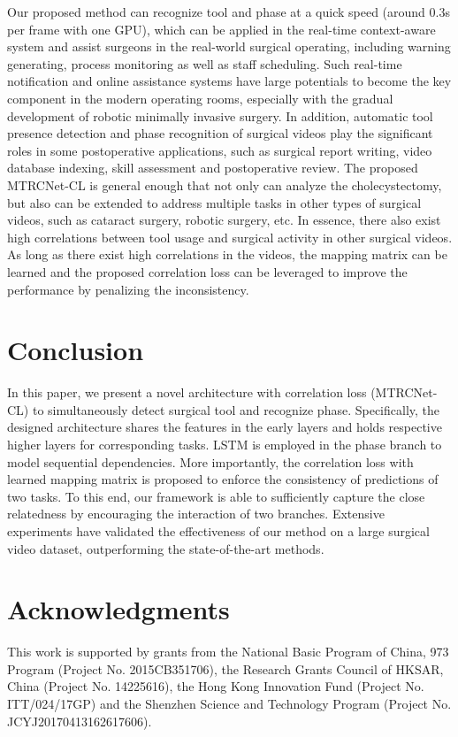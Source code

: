 \documentclass{elsarticle}
\begin{document}
Our proposed method can recognize tool and phase at a quick speed (around 0.3s per frame with one GPU),
which can be applied in the real-time context-aware system and assist surgeons in the real-world surgical operating,
including warning generating, process monitoring as well as staff scheduling.
Such real-time notification and online assistance systems have large potentials to become the key component in the modern operating rooms, especially with the gradual development of robotic minimally invasive surgery.
In addition, automatic tool presence detection and phase recognition of surgical videos play the significant roles in some postoperative applications, such as surgical report writing, video database indexing, skill assessment and postoperative review.
The proposed MTRCNet-CL is general enough that not only can analyze the cholecystectomy, but also can be extended to address multiple tasks in other types of surgical videos, such as cataract surgery, robotic surgery, etc.
In essence, there also exist high correlations between tool usage and surgical activity in other surgical videos.
As long as there exist high correlations in the videos, the mapping matrix can be learned and the proposed correlation loss can be leveraged to improve the performance by penalizing the inconsistency.





\section{Conclusion}
In this paper, we present a novel architecture with correlation loss (MTRCNet-CL) to simultaneously detect surgical tool and recognize phase.
Specifically, the designed architecture shares the features in the early layers and holds respective higher layers for corresponding tasks.
LSTM is employed in the phase branch to model sequential dependencies.
More importantly, the correlation loss with learned mapping matrix is proposed to enforce the consistency of predictions of two tasks.
To this end, our framework is able to sufficiently capture the close relatedness by encouraging the interaction of two branches.
Extensive experiments have validated the effectiveness of our method on a large surgical video dataset, outperforming the state-of-the-art methods.



\section*{Acknowledgments}
This work is supported by grants from the National Basic Program of China, 973 Program (Project No. 2015CB351706), the Research Grants Council of HKSAR, China (Project No. 14225616), the Hong Kong Innovation Fund (Project No. ITT/024/17GP) and the Shenzhen Science and Technology Program (Project No. JCYJ20170413162617606).





\end{document}
